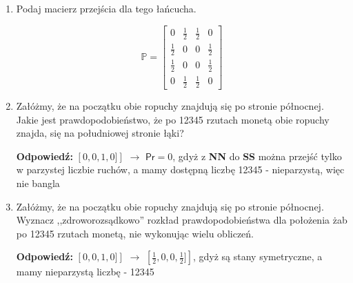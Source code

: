\documentclass[a4paper,12pt]{article}
\theoremstyle{definition}%
\theoremstyle{definition}
\theoremstyle{problem}
\begin{document}
\begin{enumerate}[label=\alph*)]
\item Podaj macierz przejścia dla tego łańcucha.

$$\mathbb{P}=\begin{bmatrix}
0&\frac{1}{2}&\frac{1}{2}&0\\
\frac{1}{2}&0&0&\frac{1}{2}\\
\frac{1}{2}&0&0&\frac{1}{2}\\
0&\frac{1}{2}&\frac{1}{2}&0
\end{bmatrix}$$
\item Załóżmy, że na początku obie ropuchy znajdują się po stronie północnej. Jakie jest prawdopodobieństwo, że po 12345 rzutach monetą obie ropuchy znajda, się na południowej stronie łąki?

\textbf{Odpowiedź: }$\left[0,0,1,0]\right]$ $\rightarrow$ $\mathsf{Pr}=0$, gdyż z \textbf{NN} do \textbf{SS} można przejść tylko w parzystej liczbie ruchów, a mamy dostępną liczbę 12345 - nieparzystą, więc nie bangla
\item  Załóżmy, że na początku obie ropuchy znajdują się po stronie północnej. Wyznacz ,,zdroworozsądkowo'' rozkład prawdopodobieństwa dla położenia żab po 12345 rzutach monetą, nie wykonując wielu obliczeń.

\textbf{Odpowiedź: }$\left[0,0,1,0]\right]$ $\rightarrow$ $\left[\frac{1}{2},0,0,\frac{1}{2}]\right]$, gdyż są stany symetryczne, a mamy nieparzystą liczbę - 12345
\end{enumerate}
\end{document}
